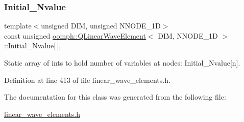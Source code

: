 \subsubsection{\texorpdfstring{Initial\+\_\+\+Nvalue}{Initial\_Nvalue}}
{\footnotesize\ttfamily template$<$unsigned D\+IM, unsigned N\+N\+O\+D\+E\+\_\+1D$>$ \\
const unsigned \hyperlink{classoomph_1_1QLinearWaveElement}{oomph\+::\+Q\+Linear\+Wave\+Element}$<$ D\+IM, N\+N\+O\+D\+E\+\_\+1D $>$\+::Initial\+\_\+\+Nvalue\mbox{[}$\,$\mbox{]}\hspace{0.3cm}{\ttfamily [static]}, {\ttfamily [private]}}



Static array of ints to hold number of variables at nodes\+: Initial\+\_\+\+Nvalue\mbox{[}n\mbox{]}. 



Definition at line 413 of file linear\+\_\+wave\+\_\+elements.\+h.



The documentation for this class was generated from the following file\+:\begin{DoxyCompactItemize}
\item 
\hyperlink{linear__wave__elements_8h}{linear\+\_\+wave\+\_\+elements.\+h}\end{DoxyCompactItemize}
